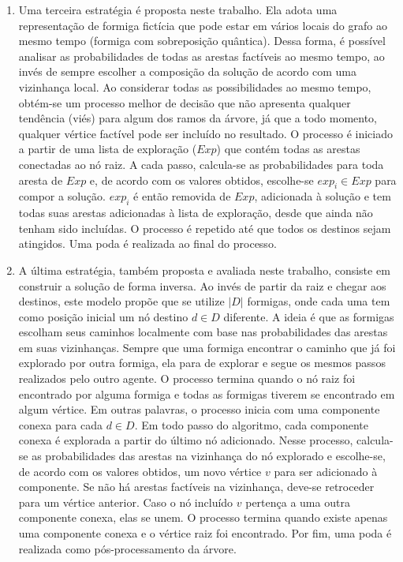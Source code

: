 \begin{enumerate}
	\item Uma terceira estratégia é proposta neste trabalho. Ela adota uma representação de formiga fictícia que pode estar em vários locais do grafo ao mesmo tempo (formiga com sobreposição quântica). Dessa forma, é possível analisar as probabilidades de todas as arestas factíveis ao mesmo tempo, ao invés de sempre escolher a composição da solução de acordo com uma vizinhança local. Ao considerar todas as possibilidades ao mesmo tempo, obtém-se um processo melhor de decisão que não apresenta qualquer tendência (viés) para algum dos ramos da árvore, já que a todo momento, qualquer vértice factível pode ser incluído no resultado. O processo é iniciado a partir de uma lista de exploração ($Exp$) que contém todas as arestas conectadas ao nó raiz. A cada passo, calcula-se as probabilidades para toda aresta de $Exp$ e, de acordo com os valores obtidos, escolhe-se $exp_i \in Exp$ para compor a solução. $exp_i$ é então removida de $Exp$, adicionada à solução e tem todas suas arestas adicionadas à lista de exploração, desde que ainda não tenham sido incluídas. O processo é repetido até que todos os destinos sejam atingidos. Uma poda é realizada ao final do processo.
	\item A última estratégia, também proposta e avaliada neste trabalho, consiste em construir a solução de forma inversa. Ao invés de partir da raiz e chegar aos destinos, este modelo propõe que se utilize $|D|$ formigas, onde cada uma tem como posição inicial um nó destino $d \in D$ diferente. A ideia é que as formigas escolham seus caminhos localmente com base nas probabilidades das arestas em suas vizinhanças. Sempre que uma formiga encontrar o caminho que já foi explorado por outra formiga, ela para de explorar e segue os mesmos passos realizados pelo outro agente. O processo termina quando o nó raiz foi encontrado por alguma formiga e todas as formigas tiverem se encontrado em algum vértice. Em outras palavras, o processo inicia com uma componente conexa para cada $d \in D$. Em todo passo do algoritmo, cada componente conexa é explorada a partir do último nó adicionado. Nesse processo, calcula-se as probabilidades das arestas na vizinhança do nó explorado e escolhe-se, de acordo com os valores obtidos, um novo vértice $v$ para ser adicionado à componente. Se não há arestas factíveis na vizinhança, deve-se retroceder para um vértice anterior. Caso o nó incluído $v$ pertença a uma outra componente conexa, elas se unem. O processo termina quando existe apenas uma componente conexa e o vértice raiz foi encontrado. Por fim, uma poda é realizada como pós-processamento da árvore. 
\end{enumerate}


